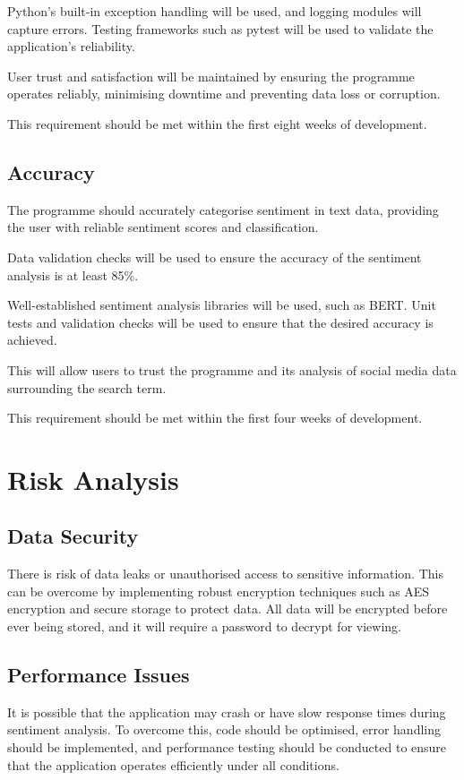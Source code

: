     Python's built-in exception handling will be used, and logging modules will capture errors. Testing frameworks such as pytest will be used to validate the application's reliability.

    User trust and satisfaction will be maintained by ensuring the programme operates reliably, minimising downtime and preventing data loss or corruption.

    This requirement should be met within the first eight weeks of development.

    \subsection{Accuracy}
    The programme should accurately categorise sentiment in text data, providing the user with reliable sentiment scores and classification.

    Data validation checks will be used to ensure the accuracy of the sentiment analysis is at least 85\%.

    Well-established sentiment analysis libraries will be used, such as BERT. Unit tests and validation checks will be used to ensure that the desired accuracy is achieved.

    This will allow users to trust the programme and its analysis of social media data surrounding the search term.

    This requirement should be met within the first four weeks of development.

\section{Risk Analysis}

    \subsection{Data Security}
    There is risk of data leaks or unauthorised access to sensitive information. This can be overcome by implementing robust encryption techniques such as AES encryption and secure storage to protect data. All data will be encrypted before ever being stored, and it will require a password to decrypt for viewing.

    \subsection{Performance Issues}
    It is possible that the application may crash or have slow response times during sentiment analysis. To overcome this, code should be optimised, error handling should be implemented, and performance testing should be conducted to ensure that the application operates efficiently under all conditions.

